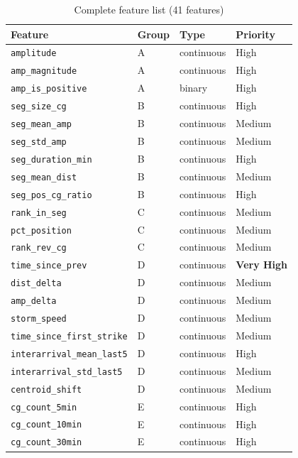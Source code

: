 \documentclass[12pt,a4paper]{article}
\begin{document}
\begin{table}[H]
\centering
\caption{Complete feature list (41 features)}
\begin{tabular}{llll}
\toprule
\textbf{Feature} & \textbf{Group} & \textbf{Type} & \textbf{Priority} \\
\midrule
\texttt{amplitude}                & A & continuous & High \\
\texttt{amp\_magnitude}           & A & continuous & High \\
\texttt{amp\_is\_positive}        & A & binary     & High \\
\texttt{seg\_size\_cg}            & B & continuous & High \\
\texttt{seg\_mean\_amp}           & B & continuous & Medium \\
\texttt{seg\_std\_amp}            & B & continuous & Medium \\
\texttt{seg\_duration\_min}       & B & continuous & High \\
\texttt{seg\_mean\_dist}          & B & continuous & Medium \\
\texttt{seg\_pos\_cg\_ratio}      & B & continuous & High \\
\texttt{rank\_in\_seg}            & C & continuous & Medium \\
\texttt{pct\_position}            & C & continuous & Medium \\
\texttt{rank\_rev\_cg}            & C & continuous & Medium \\
\texttt{time\_since\_prev}           & D & continuous & \textbf{Very High} \\
\texttt{dist\_delta}               & D & continuous & Medium \\
\texttt{amp\_delta}                & D & continuous & Medium \\
\texttt{storm\_speed}              & D & continuous & Medium \\
\texttt{time\_since\_first\_strike} & D & continuous & Medium \\
\texttt{interarrival\_mean\_last5}  & D & continuous & High \\
\texttt{interarrival\_std\_last5}   & D & continuous & Medium \\
\texttt{centroid\_shift}            & D & continuous & Medium \\
\texttt{cg\_count\_5min}          & E & continuous & High \\
\texttt{cg\_count\_10min}         & E & continuous & High \\
\texttt{cg\_count\_30min}         & E & continuous & High \\

\end{tabular}
\end{table}
\end{document}
